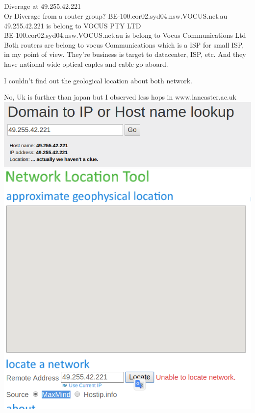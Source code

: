 \documentclass{article}
\begin{document}
\subsection{}
Diverage at 49.255.42.221\\
Or Diverage from a router group? BE-100.cor02.syd04.nsw.VOCUS.net.au \\
49.255.42.221 is belong to VOCUS PTY LTD\\
BE-100.cor02.syd04.nsw.VOCUS.net.au is belong to Vocus Communications Ltd\\

Both routers are belong to vocus Communications which is a ISP for small ISP, in my point of view. They're business is target to datacenter, ISP, etc. And they have national wide optical caples and cable go aboard.

I couldn't find out the geological location about both network.

No, Uk is further than japan but I observed less hops in www.lancaster.ac.uk
\includegraphics[width=\textwidth]{Location_wont_work.png}
\includegraphics[width=\textwidth]{Location_wont_work2.png}
\end{document}
